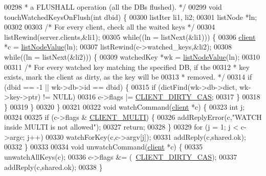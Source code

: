 \begin{DoxyCode}
00298 \textcolor{comment}{ * a FLUSHALL operation (all the DBs flushed). */}
00299 \textcolor{keywordtype}{void} touchWatchedKeysOnFlush(\textcolor{keywordtype}{int} dbid) \{
00300     listIter li1, li2;
00301     listNode *ln;
00302 
00303     \textcolor{comment}{/* For every client, check all the waited keys */}
00304     listRewind(server.clients,&li1);
00305     \textcolor{keywordflow}{while}((ln = listNext(&li1))) \{
00306         \hyperlink{structclient}{client} *c = \hyperlink{adlist_8h_af84cae230e7180ebcda1e2736fce9f65}{listNodeValue}(ln);
00307         listRewind(c->watched\_keys,&li2);
00308         \textcolor{keywordflow}{while}((ln = listNext(&li2))) \{
00309             watchedKey *wk = \hyperlink{adlist_8h_af84cae230e7180ebcda1e2736fce9f65}{listNodeValue}(ln);
00310 
00311             \textcolor{comment}{/* For every watched key matching the specified DB, if the}
00312 \textcolor{comment}{             * key exists, mark the client as dirty, as the key will be}
00313 \textcolor{comment}{             * removed. */}
00314             \textcolor{keywordflow}{if} (dbid == -1 || wk->db->id == dbid) \{
00315                 \textcolor{keywordflow}{if} (dictFind(wk->db->dict, wk->key->ptr) != NULL)
00316                     c->flags |= \hyperlink{server_8h_a0f4df645d72b6b3e9a0d07afbe502a51}{CLIENT\_DIRTY\_CAS};
00317             \}
00318         \}
00319     \}
00320 \}
00321 
00322 \textcolor{keywordtype}{void} watchCommand(\hyperlink{structclient}{client} *c) \{
00323     \textcolor{keywordtype}{int} j;
00324 
00325     \textcolor{keywordflow}{if} (c->flags & \hyperlink{server_8h_a7f61f783f429419f8c593291a509b03a}{CLIENT\_MULTI}) \{
00326         addReplyError(c,\textcolor{stringliteral}{"WATCH inside MULTI is not allowed"});
00327         \textcolor{keywordflow}{return};
00328     \}
00329     \textcolor{keywordflow}{for} (j = 1; j < c->argc; j++)
00330         watchForKey(c,c->argv[j]);
00331     addReply(c,shared.ok);
00332 \}
00333 
00334 \textcolor{keywordtype}{void} unwatchCommand(\hyperlink{structclient}{client} *c) \{
00335     unwatchAllKeys(c);
00336     c->flags &= (~\hyperlink{server_8h_a0f4df645d72b6b3e9a0d07afbe502a51}{CLIENT\_DIRTY\_CAS});
00337     addReply(c,shared.ok);
00338 \}
\end{DoxyCode}
